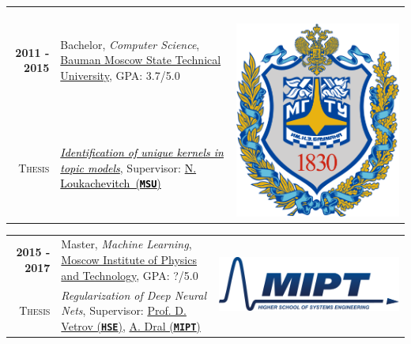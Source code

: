 \documentclass[a4paper,10pt]{article} %
\begin{document}
\begin{tabular}{rp{14cm}c}	
\textbf{2011 -  2015} & Bachelor, \emph{Computer Science}, \href{http://www.bmstu.ru/en/}{Bauman Moscow State Technical University}, GPA: 3.7/5.0 & \multirow{2}{*}{~~~~~\includegraphics[scale=0.012]{img/bmstu}}\\
\textsc{Thesis} &\emph{\href{https://github.com/ars-ashuha/bigram-anchor-words}{\textcolor{black}{Identification of unique kernels in topic models}}}, Supervisor:  \href{http://istina.msu.ru/profile/louk_nat/}{\textcolor{black}{N. Loukachevitch~(\texttt{\textbf{MSU}})}}
\end{tabular}

\begin{tabular}{rp{14cm}c}	
\textbf{2015 -  2017} & Master, \emph{Machine Learning}, \href{https://mipt.ru/english}{Moscow Institute of Physics and Technology}, GPA: ?/5.0& \multirow{2}{*}{\includegraphics[scale=0.15]{img/mipt}}\\
\textsc{Thesis} & \emph{Regularization of Deep Neural Nets}, Supervisor: \href{https://www.hse.ru/staff/dvetrov}{Prof. D. Vetrov (\texttt{\textbf{HSE}})}, \href{https://ru.linkedin.com/in/alexey-dral}{A. Dral (\texttt{\textbf{MIPT}})}
\end{tabular}
\end{document}
